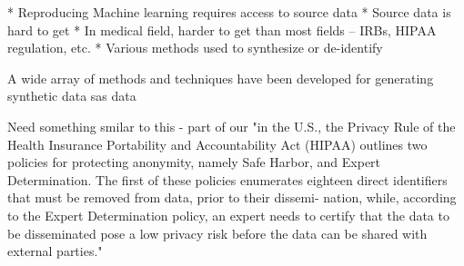 
* Reproducing Machine learning requires access to source data
* Source data is hard to get
* In medical field, harder to get than most fields – IRBs, HIPAA regulation, etc.
* Various methods used to synthesize or de-identify

A wide array of methods and techniques have been developed for generating synthetic data sas  data \cite{walonoski_synthea:_2018}

Need something smilar to this - part of our 
"in the U.S., the Privacy Rule of the Health Insurance Portability and Accountability Act (HIPAA)  outlines two policies for protecting anonymity, namely Safe Harbor, and Expert Determination. The first of these policies enumerates eighteen direct identifiers that must be removed from data, prior to their dissemi- nation, while, according to the Expert Determination policy, an expert needs to certify that the data to be disseminated pose a low privacy risk before the data can be shared with external parties."